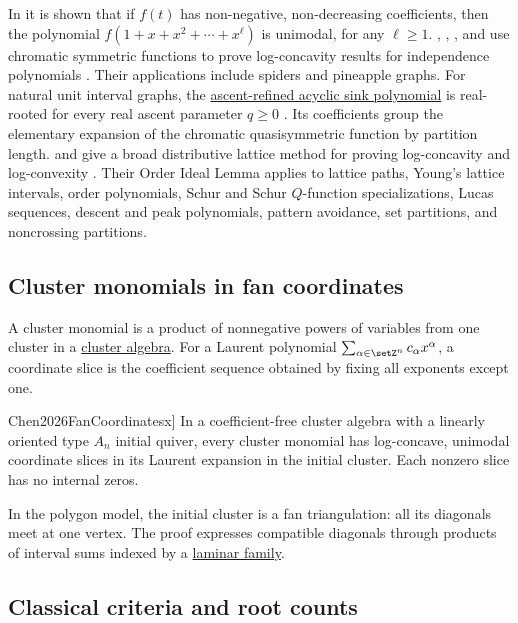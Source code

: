 In \cite{AhmiaBelbachir2018} it is shown that if $f(t)$
has non-negative, non-decreasing coefficients, then the polynomial
$f(1+x+x^2+\dotsb+x^\ell)$ is unimodal,
for any $\ell \geq 1$.
, , , and
 use chromatic symmetric functions to prove
log-concavity results for independence polynomials \cite{LiLiYangZhang2025x}.
Their applications include spiders and pineapple graphs.
For natural unit interval graphs, the
\hyperref[chromaticSinkRealRooted]{ascent-refined acyclic sink polynomial}
is real-rooted for every real ascent parameter $q\geq0$
\cite[Thm.~5.2]{AlexanderssonLeite2026x}. Its coefficients group the
elementary expansion of the chromatic quasisymmetric function by
partition length.
 and  give a broad distributive
lattice method for proving log-concavity and log-convexity
\cite{LiangSagan2024x}.  Their Order Ideal Lemma applies to lattice paths,
Young's lattice intervals, order polynomials, Schur and Schur \(Q\)-function
specializations, Lucas sequences, descent and peak polynomials, pattern
avoidance, set partitions, and noncrossing partitions.


\subsection[clusterFanLogConcavity]{Cluster monomials in fan coordinates}

A cluster monomial is a product of nonnegative powers of variables from
one cluster in a \hyperref[dictionaryAlgebraRepresentation]{cluster algebra}.
For a Laurent polynomial $\sum_{\alpha\in\setZ^n}c_\alpha x^\alpha$,
a coordinate slice is the coefficient sequence obtained by fixing all
exponents except one.

\begin{theorem}[Chen, \cite[Thm.~1.3]{Chen2026FanCoordinatesx}]
In a coefficient-free cluster algebra with a linearly oriented type $A_n$
initial quiver, every cluster monomial has log-concave, unimodal coordinate
slices in its Laurent expansion in the initial cluster. Each nonzero slice
has no internal zeros.
\end{theorem}

In the polygon model, the initial cluster is a fan triangulation:
all its diagonals meet at one vertex. The proof expresses compatible
diagonals through products of interval sums indexed by a
\hyperref[laminarFamily]{laminar family}.

\subsection[classicalRootCriteria]{Classical criteria and root counts}

